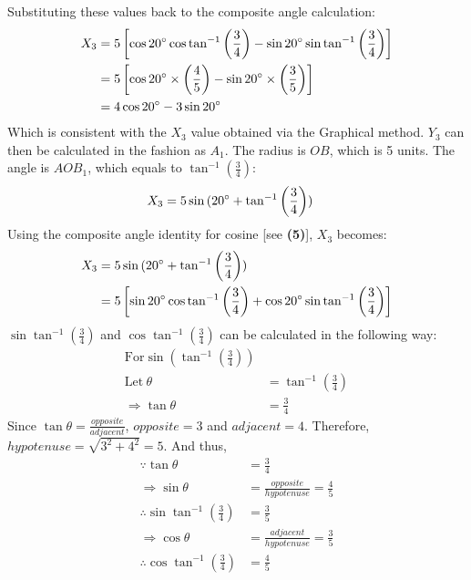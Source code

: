 \documentclass{article}
\begin{document}
            Substituting these values back to the composite angle calculation:
            \begin{align*}
                X_3 &= 5\left[\cos{20\degree}\cos{\tan^{-1}{\left(\frac{3}{4}\right)}} - \sin{20\degree}\sin{\tan^{-1}{\left(\frac{3}{4}\right)}}\right] \\
                &= 5\left[\cos{20\degree}\times \left( \frac{4}{5}\right)  - \sin{20\degree} \times \left( \frac{3}{5}\right)   \right] \\
                &= 4\cos{20\degree} - 3\sin{20\degree}
            \end{align*}
            Which is consistent with the $X_3$ value obtained via the Graphical method.
            $Y_3$ can then be calculated in the fashion as $A_1$. The radius is $OB$, which is 5 units. The angle is $AOB_1$, which equals to $\tan^{-1}{\left(\frac{3}{4}\right)}$:
            \begin{align*}
            X_3 &= 5\sin{(20\degree + \tan^{-1}{\left(\frac{3}{4}\right))}}
            \end{align*}
            Using the composite angle identity for cosine [see \textbf{(5)}], $X_3$ becomes:
            \begin{align*}
            X_3 &= 5\sin{(20\degree + \tan^{-1}{\left(\frac{3}{4}\right)})} \\
            &= 5\left[\sin{20\degree}\cos{\tan^{-1}{\left(\frac{3}{4}\right)}} + \cos{20\degree}\sin{\tan^{-1}{\left(\frac{3}{4}\right)}}\right]
            \end{align*}
            $\sin{\tan^{-1}{\left(\frac{3}{4}\right)}}$ and $\cos{\tan^{-1}{\left(\frac{3}{4}\right)}}$ can be calculated in the following way:
            \begin{align*}
            \mathrm{For} \sin{\left( \tan^{-1}{\left(\frac{3}{4}\right)}\right) } \\
            \mathrm{Let \ } \theta &= \tan^{-1}{\left(\frac{3}{4}\right)} \\
            \Rightarrow \tan{\theta} &= \frac{3}{4}
            \end{align*}
            Since $\tan{\theta} = \frac{opposite}{adjacent}$, $opposite = 3$ and $adjacent = 4$. Therefore, $hypotenuse = \sqrt{3^2 + 4^2} = 5$. And thus,
            \begin{align*}
            \because \tan{\theta} &= \frac{3}{4} \\
            \Rightarrow \sin{\theta} &= \frac{opposite}{hypotenuse} = \frac{4}{5} \\
            \therefore \sin{\tan^{-1}{\left(\frac{3}{4}\right)}} &= \frac{3}{5} \\
            \Rightarrow \cos{\theta} &= \frac{adjacent}{hypotenuse} = \frac{3}{5} \\
            \therefore \cos{\tan^{-1}{\left(\frac{3}{4}\right)}} &= \frac{4}{5}
            \end{align*}
\end{document}
